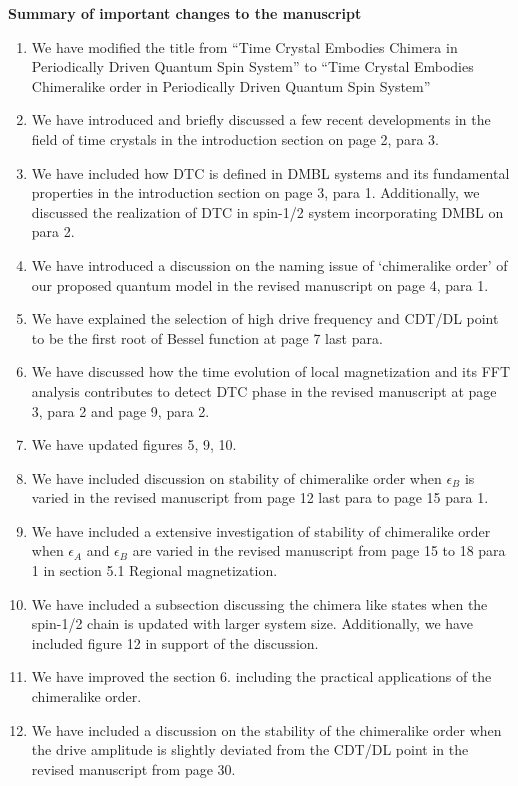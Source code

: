 \documentclass[aps,prb,reprint,showpacs,floatfix,superscriptaddress, onecolumn, nofootinbib, 10pt]{revtex4-2}
\begin{document}
		
\newpage		
\noindent \textbf{Summary of important changes to the  manuscript}
\begin{enumerate}
	\item We have modified the title from ``Time Crystal Embodies Chimera in Periodically Driven Quantum Spin System'' to ``Time Crystal Embodies Chimeralike order in Periodically Driven Quantum Spin System''
	\item We have introduced and briefly discussed a few recent developments in the field of time crystals in the introduction section on page 2, para 3.
	\item We have included how DTC is defined in DMBL systems and its fundamental properties in the introduction section on page 3, para 1. Additionally, we discussed the realization of DTC in spin-1/2 system incorporating DMBL on para 2.
	\item We have introduced a discussion on the naming issue of `chimeralike order' of our proposed quantum model in the revised manuscript on page 4, para 1.
	\item We have explained the selection of high drive frequency and CDT/DL point to be the first root of Bessel function at page 7 last para.
	\item We have discussed how the time evolution of local magnetization and its FFT analysis contributes to detect DTC phase in the revised manuscript at page 3, para 2 and page 9, para 2.
	\item We have updated figures 5, 9, 10.
	\item We have included discussion on stability of chimeralike order when $\epsilon_B$ is varied in the revised manuscript from page 12 last para to page 15 para 1.
	\item We have included a extensive investigation of stability of chimeralike order when $\epsilon_A$ and $\epsilon_B$ are varied in the revised manuscript from page 15 to 18 para 1 in section 5.1 Regional magnetization.
	\item We have included a subsection discussing the chimera like states when the spin-1/2 chain is updated with larger system size. Additionally, we have included figure 12 in support of the discussion.
	\item We have improved the section 6. including the practical applications of the chimeralike order.
	\item We have included a discussion on the stability of the chimeralike order when the drive amplitude is slightly deviated from the CDT/DL point in the revised manuscript from page 30. 
 \end{enumerate}



\end{document}
